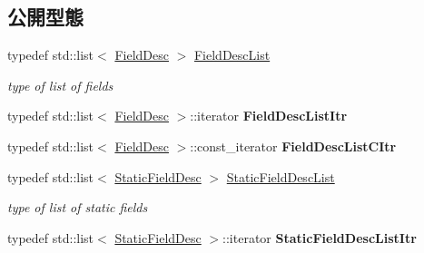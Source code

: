 \subsection*{公開型態}
\begin{DoxyCompactItemize}
\item 
typedef std\+::list$<$ \hyperlink{classagm_1_1reflection_1_1_field_desc}{Field\+Desc} $>$ \hyperlink{classagm_1_1reflection_1_1_class_desc_a63d811e9dca6028408a4e57b3c7649c4}{Field\+Desc\+List}\hypertarget{classagm_1_1reflection_1_1_class_desc_a63d811e9dca6028408a4e57b3c7649c4}{}\label{classagm_1_1reflection_1_1_class_desc_a63d811e9dca6028408a4e57b3c7649c4}

\begin{DoxyCompactList}\small\item\em type of list of fields \end{DoxyCompactList}\item 
typedef std\+::list$<$ \hyperlink{classagm_1_1reflection_1_1_field_desc}{Field\+Desc} $>$\+::iterator {\bfseries Field\+Desc\+List\+Itr}\hypertarget{classagm_1_1reflection_1_1_class_desc_a63fa19c7eff76d2df48e37a949908992}{}\label{classagm_1_1reflection_1_1_class_desc_a63fa19c7eff76d2df48e37a949908992}

\item 
typedef std\+::list$<$ \hyperlink{classagm_1_1reflection_1_1_field_desc}{Field\+Desc} $>$\+::const\+\_\+iterator {\bfseries Field\+Desc\+List\+C\+Itr}\hypertarget{classagm_1_1reflection_1_1_class_desc_a9b423f2396efd73a720ae4afdca18600}{}\label{classagm_1_1reflection_1_1_class_desc_a9b423f2396efd73a720ae4afdca18600}

\item 
typedef std\+::list$<$ \hyperlink{classagm_1_1reflection_1_1_static_field_desc}{Static\+Field\+Desc} $>$ \hyperlink{classagm_1_1reflection_1_1_class_desc_a46ac1af257e4491e7bbdf38657696d71}{Static\+Field\+Desc\+List}\hypertarget{classagm_1_1reflection_1_1_class_desc_a46ac1af257e4491e7bbdf38657696d71}{}\label{classagm_1_1reflection_1_1_class_desc_a46ac1af257e4491e7bbdf38657696d71}

\begin{DoxyCompactList}\small\item\em type of list of static fields \end{DoxyCompactList}\item 
typedef std\+::list$<$ \hyperlink{classagm_1_1reflection_1_1_static_field_desc}{Static\+Field\+Desc} $>$\+::iterator {\bfseries Static\+Field\+Desc\+List\+Itr}\hypertarget{classagm_1_1reflection_1_1_class_desc_aced634c64f9e6f47decaa48821272feb}{}\label{classagm_1_1reflection_1_1_class_desc_aced634c64f9e6f47decaa48821272feb}


\end{DoxyCompactItemize}
